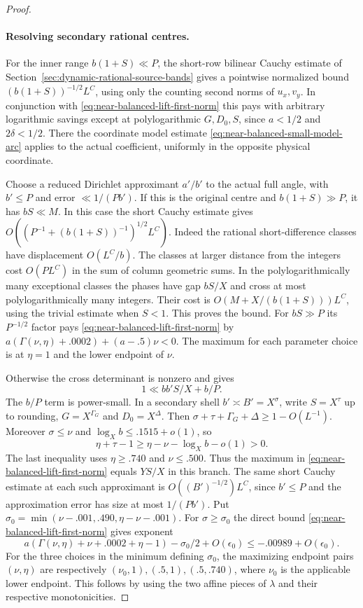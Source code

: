 \documentclass[11pt,a4paper]{article}
\theoremstyle{paperplain}
\numberwithin{equation}{section}
\begin{document}
\begin{proof}
\paragraph{Resolving secondary rational centres.}
For the inner range $b(1+S)\ll P$, the short-row bilinear
Cauchy estimate of Section~\ref{sec:dynamic-rational-source-bands}
gives a pointwise normalized bound $(b(1+S))^{-1/2}L^C$,
using only the counting second norms of $u_x,v_y$.
In conjunction with \eqref{eq:near-balanced-lift-first-norm}
this pays with arbitrary logarithmic savings except at
polylogarithmic $G,D_0,S$, since $a<1/2$ and $2\delta<1/2$.
There the coordinate model estimate
\eqref{eq:near-balanced-small-model-arc} applies to the
actual coefficient, uniformly in the opposite physical
coordinate.

Choose a reduced Dirichlet approximant $a'/b'$ to the
actual full angle, with $b'\le P$ and error
$\ll1/(Pb')$. If this is the original centre and
$b(1+S)\gg P$, it has $bS\ll M$. In this case the
short Cauchy estimate gives $O((P^{-1}+(b(1+S))^{-1})^{1/2}L^C)$.
Indeed the rational short-difference classes have displacement
$O(L^C/b)$. The classes at larger distance from the integers
cost $O(P L^C)$ in the sum of column geometric sums.
In the polylogarithmically many exceptional classes the phases have
gap $bS/X$ and cross at most polylogarithmically many integers. Their
cost is $O(M+X/(b(1+S)))L^C$, using the trivial estimate
when $S<1$. This proves the bound. For $bS\gg P$ its
$P^{-1/2}$ factor pays \eqref{eq:near-balanced-lift-first-norm}
by $a(\Gamma(\nu,\eta)+.0002)+(a-.5)\nu<0$. The maximum
for each parameter choice is at $\eta=1$ and the lower
endpoint of $\nu$.

Otherwise the cross determinant is nonzero and gives
\begin{equation}\label{eq:near-balanced-cross-determinant}
               1\ll b b' S/X + b/P.
\end{equation}
The $b/P$ term is power-small. In a secondary shell
$b'\asymp B'=X^\sigma$, write $S=X^\tau$ up to rounding,
$G=X^{\Gamma_G}$ and $D_0=X^\Delta$. Then
$\sigma+\tau+\Gamma_G+\Delta\ge1-O(L^{-1})$.
Moreover $\sigma\le\nu$ and $\log_X b\le .1515+o(1)$, so
\[
 \eta+\tau-1\ge\eta-\nu-\log_X b-o(1)>0.
\]
The last inequality uses $\eta\ge.740$ and $\nu\le.500$.
Thus the maximum in
\eqref{eq:near-balanced-lift-first-norm} equals $YS/X$ in this branch.
The same short Cauchy estimate at each such approximant
is $O((B')^{-1/2})L^C$, since $b'\le P$ and the
approximation error has size at most $1/(P b')$. Put
$\sigma_0=\min(\nu-.001,.490,\eta-\nu-.001)$.
For $\sigma\ge\sigma_0$ the direct bound
\eqref{eq:near-balanced-lift-first-norm} gives exponent
\[
  a(\Gamma(\nu,\eta)+\nu+.0002+\eta-1)-\sigma_0/2
     +O(\epsilon_0)\le-.00989+O(\epsilon_0).
\]
For the three choices in the minimum defining $\sigma_0$,
the maximizing endpoint pairs $(\nu,\eta)$ are respectively
$(\nu_0,1),(.5,1),(.5,.740)$, where $\nu_0$ is the applicable
lower endpoint. This follows by using the two affine pieces
of $\lambda$ and their respective monotonicities.


\end{proof}
\end{document}
